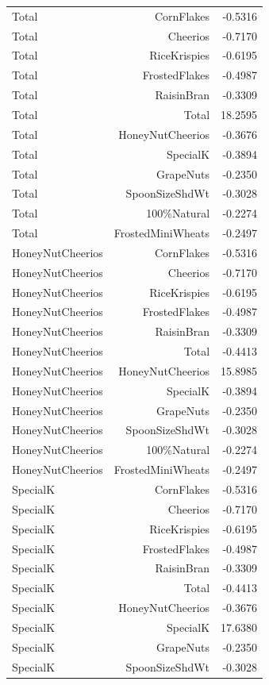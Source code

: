 \begin{longtable}{@{}lrr@{}}
Total & CornFlakes & -0.5316 \\
Total & Cheerios & -0.7170 \\
Total & RiceKrispies & -0.6195 \\
Total & FrostedFlakes & -0.4987 \\
Total & RaisinBran & -0.3309 \\
Total & Total & 18.2595 \\
Total & HoneyNutCheerios & -0.3676 \\
Total & SpecialK & -0.3894 \\
Total & GrapeNuts & -0.2350 \\
Total & SpoonSizeShdWt & -0.3028 \\
Total & 100\%Natural & -0.2274 \\
Total & FrostedMiniWheats & -0.2497 \\
HoneyNutCheerios & CornFlakes & -0.5316 \\
HoneyNutCheerios & Cheerios & -0.7170 \\
HoneyNutCheerios & RiceKrispies & -0.6195 \\
HoneyNutCheerios & FrostedFlakes & -0.4987 \\
HoneyNutCheerios & RaisinBran & -0.3309 \\
HoneyNutCheerios & Total & -0.4413 \\
HoneyNutCheerios & HoneyNutCheerios & 15.8985 \\
HoneyNutCheerios & SpecialK & -0.3894 \\
HoneyNutCheerios & GrapeNuts & -0.2350 \\
HoneyNutCheerios & SpoonSizeShdWt & -0.3028 \\
HoneyNutCheerios & 100\%Natural & -0.2274 \\
HoneyNutCheerios & FrostedMiniWheats & -0.2497 \\
SpecialK & CornFlakes & -0.5316 \\
SpecialK & Cheerios & -0.7170 \\
SpecialK & RiceKrispies & -0.6195 \\
SpecialK & FrostedFlakes & -0.4987 \\
SpecialK & RaisinBran & -0.3309 \\
SpecialK & Total & -0.4413 \\
SpecialK & HoneyNutCheerios & -0.3676 \\
SpecialK & SpecialK & 17.6380 \\
SpecialK & GrapeNuts & -0.2350 \\
SpecialK & SpoonSizeShdWt & -0.3028 \\

\end{longtable}
